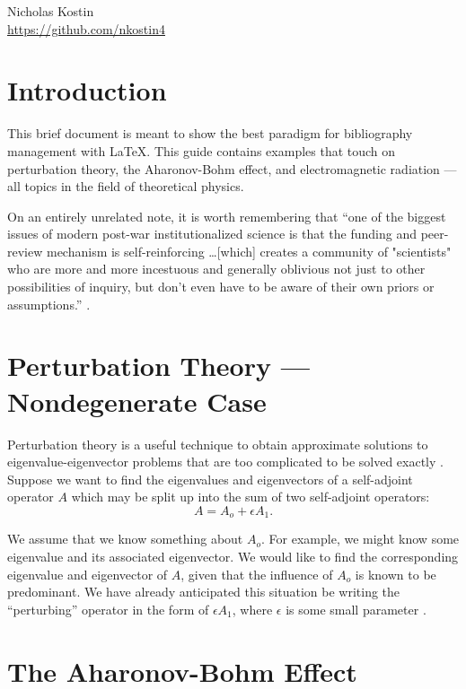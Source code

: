 \documentclass{article}
\begin{document}
Nicholas Kostin \\
\url{https://github.com/nkostin4}


\section{Introduction}

This brief document is meant to show the best paradigm for bibliography management with {\LaTeX}. This guide contains examples that touch on perturbation theory, the Aharonov-Bohm effect, and electromagnetic radiation --- all topics in the field of theoretical physics.

\vspace{1em}

On an entirely unrelated note, it is worth remembering that ``one of the biggest issues of modern post-war institutionalized science is that the funding and peer-review mechanism is self-reinforcing \ldots [which] creates a community of "scientists" who are more and more incestuous and generally oblivious not just to other possibilities of inquiry, but don't even have to be aware of their own priors or assumptions.'' \cite{fragile}. 

\section{Perturbation Theory --- Nondegenerate Case}

Perturbation theory is a useful technique to obtain approximate solutions to eigenvalue-eigenvector problems that are too complicated to be solved exactly \cite{byronfuller}. Suppose we want to find the eigenvalues and eigenvectors of a self-adjoint operator $A$ which may be split up into the sum of two self-adjoint operators:
\begin{equation*}
    A = A_o + \epsilon A_1.
\end{equation*}

We assume that we know something about $A_o$. For example, we might know some eigenvalue and its associated eigenvector. We would like to find the corresponding eigenvalue and eigenvector of $A$, given that the influence of $A_o$ is known to be predominant. We have already anticipated this situation be writing the ``perturbing'' operator in the form of $\epsilon A_1$, where $\epsilon$ is some small parameter \cite{byronfuller}.

\section{The Aharonov-Bohm Effect}
\end{document}

